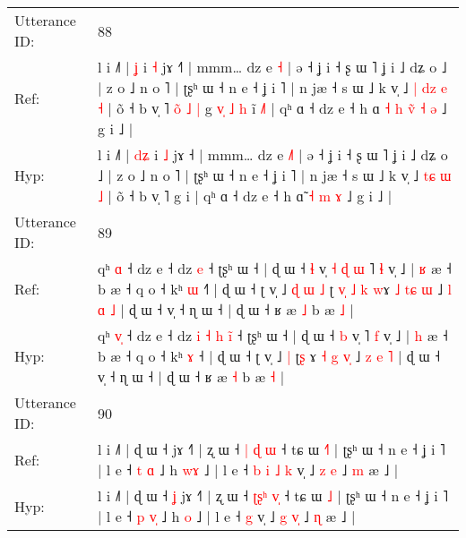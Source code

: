\documentclass[10pt]{article}
\DeclareRobustCommand{\hl}[1]{{\textcolor{red}{#1}}}
\begin{document}
\begin{longtable}{ll}
 \\
\midrule
Utterance ID: & 88 \\
Ref: & l i ˩˥ | \hl{}\hl{ʝ} i \hl{˧} jɤ ˧\hl{˥} | mmm… dz e \hl{}\hl{˧} | ə ˧ ʝ i ˧ ʂ ɯ ˥ ʝ i ˩ dʑ o ˩ | z o ˩ n o ˥ | ʈʂʰ ɯ ˧ n e ˧ ʝ i ˥ | n jæ ˧ s ɯ ˩ k v̩ ˩\hl{ }\hl{|} \hl{d}\hl{z} \hl{e} \hl{˧} | õ ˧ b v̩ ˥\hl{ }\hl{o}\hl{̃}\hl{ }\hl{˩}\hl{ }\hl{|} g\hl{ }\hl{v}\hl{̩}\hl{ }\hl{˩}\hl{ }\hl{h} i\hl{̃}\hl{ }\hl{˩}\hl{˥} | qʰ ɑ ˧ dz e ˧ h ɑ\hl{ }\hl{˧}\hl{ }\hl{h} \hl{v}\hl{̃} \hl{˧} \hl{ə} ˩ g i ˩ |
 \\
Hyp: & l i ˩˥ | \hl{d}\hl{ʑ} i \hl{˩} jɤ ˧\hl{} | mmm… dz e \hl{˩}\hl{˥} | ə ˧ ʝ i ˧ ʂ ɯ ˥ ʝ i ˩ dʑ o ˩ | z o ˩ n o ˥ | ʈʂʰ ɯ ˧ n e ˧ ʝ i ˥ | n jæ ˧ s ɯ ˩ k v̩ ˩\hl{}\hl{} \hl{t}\hl{ɕ} \hl{ɯ} \hl{˩} | õ ˧ b v̩ ˥\hl{}\hl{}\hl{}\hl{}\hl{}\hl{}\hl{} g\hl{}\hl{}\hl{}\hl{}\hl{}\hl{}\hl{} i\hl{}\hl{}\hl{}\hl{} | qʰ ɑ ˧ dz e ˧ h ɑ\hl{}\hl{}\hl{}\hl{̃} \hl{}\hl{˧} \hl{m} \hl{ɤ} ˩ g i ˩ |
 \\
\midrule
Utterance ID: & 89 \\
Ref: & qʰ \hl{}\hl{ɑ} ˧ dz e ˧ dz\hl{}\hl{}\hl{}\hl{}\hl{}\hl{} \hl{}\hl{e} ˧ ʈʂʰ ɯ ˧ | ɖ ɯ ˧ \hl{ɬ} v̩\hl{ }\hl{˧}\hl{ }\hl{ɖ}\hl{ }\hl{ɯ} ˥ \hl{ɬ} v̩ ˩ | \hl{ʁ} æ ˧ b æ ˧ q o ˧ kʰ \hl{ɯ} ˧\hl{˥} | ɖ ɯ ˧ ʈ v̩ ˩\hl{ }\hl{ɖ}\hl{ }\hl{ɯ} \hl{˩} ʈ\hl{ }\hl{v}\hl{̩}\hl{ }\hl{˩}\hl{ }\hl{k} \hl{w}ɤ \hl{˩} \hl{t}\hl{ɕ}\hl{ }\hl{ɯ} ˩ \hl{l} \hl{ɑ} \hl{˩} | ɖ ɯ ˧ v̩ ˧ ɳ ɯ ˧ | ɖ ɯ ˧ ʁ æ \hl{˩} b æ \hl{˩} |
 \\
Hyp: & qʰ \hl{v}\hl{̩} ˧ dz e ˧ dz\hl{ }\hl{i}\hl{ }\hl{˧}\hl{ }\hl{h} \hl{i}\hl{̃} ˧ ʈʂʰ ɯ ˧ | ɖ ɯ ˧ \hl{b} v̩\hl{}\hl{}\hl{}\hl{}\hl{}\hl{} ˥ \hl{f} v̩ ˩ | \hl{h} æ ˧ b æ ˧ q o ˧ kʰ \hl{ɤ} ˧\hl{} | ɖ ɯ ˧ ʈ v̩ ˩\hl{}\hl{}\hl{}\hl{} \hl{|} ʈ\hl{}\hl{}\hl{}\hl{}\hl{}\hl{}\hl{ʂ} \hl{}ɤ \hl{˧} \hl{g}\hl{ }\hl{v}\hl{̩} ˩ \hl{z} \hl{e} \hl{˥} | ɖ ɯ ˧ v̩ ˧ ɳ ɯ ˧ | ɖ ɯ ˧ ʁ æ \hl{˧} b æ \hl{˧} |
 \\
\midrule
Utterance ID: & 90 \\
Ref: & l i ˩˥ | ɖ ɯ ˧\hl{}\hl{} jɤ ˧˥ | ʐ ɯ ˧ \hl{|}\hl{ }\hl{ɖ} \hl{}\hl{ɯ} ˧ tɕ ɯ \hl{˧}\hl{˥} | ʈʂʰ ɯ ˧ n e ˧ ʝ i ˥ | l e ˧ \hl{t} \hl{}\hl{ɑ} ˩ h \hl{w}\hl{ɤ} ˩ | l e ˧\hl{ }\hl{b}\hl{ }\hl{i}\hl{ }\hl{˩} \hl{k} v̩ ˩ \hl{z} \hl{}\hl{e} ˩ \hl{m} æ ˩ |
 \\
Hyp: & l i ˩˥ | ɖ ɯ ˧\hl{ }\hl{ʝ} jɤ ˧˥ | ʐ ɯ ˧ \hl{ʈ}\hl{ʂ}\hl{ʰ} \hl{v}\hl{̩} ˧ tɕ ɯ \hl{}\hl{˩} | ʈʂʰ ɯ ˧ n e ˧ ʝ i ˥ | l e ˧ \hl{p} \hl{v}\hl{̩} ˩ h \hl{}\hl{o} ˩ | l e ˧\hl{}\hl{}\hl{}\hl{}\hl{}\hl{} \hl{g} v̩ ˩ \hl{g} \hl{v}\hl{̩} ˩ \hl{ɳ} æ ˩ |
 \\

\end{longtable}
\end{document}
